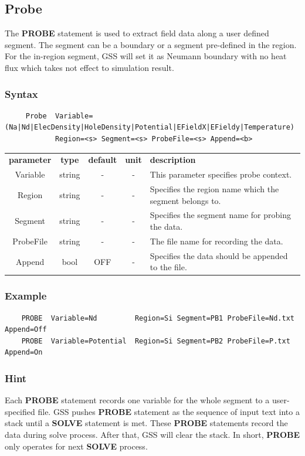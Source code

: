 \documentclass[11pt,pdftex]{article}
\begin{document}
\newpage
\subsection{Probe}
The \textbf{PROBE} statement is used to extract field data along a
user defined segment. The segment can be a boundary or a segment
pre-defined in the region. For the in-region segment, GSS will set
it as Neumann boundary with no heat flux which takes not effect to
simulation result.

\subsubsection*{Syntax}
\begin{verbatim}
     Probe  Variable=(Na|Nd|ElecDensity|HoleDensity|Potential|EFieldX|EFieldy|Temperature)
            Region=<s> Segment=<s> ProbeFile=<s> Append=<b>
\end{verbatim}

\small \noindent\begin{longtable}{ccccp{9cm}}
\textbf{parameter}   & \textbf{type}    & \textbf{default} & \textbf{unit} & \textbf{description} \\
Variable      & string  & -  & -             & This parameter specifies probe context.\\
Region        & string  & -  & -             & Specifies the region name which the segment belongs to.\\
Segment       & string  & -  & -             & Specifies the segment name for probing the data.\\
ProbeFile     & string  & -  & -             & The file name for recording the data.\\
Append        & bool    &OFF & -             & Specifies the data should be appended to the file.  \\
\end{longtable}
\normalsize

\subsubsection*{Example}
\begin{verbatim}
    PROBE  Variable=Nd         Region=Si Segment=PB1 ProbeFile=Nd.txt Append=Off
    PROBE  Variable=Potential  Region=Si Segment=PB2 ProbeFile=P.txt  Append=On
\end{verbatim}

\subsubsection*{Hint}
Each \textbf{PROBE} statement records one variable for the whole segment to a user-specified file.
GSS pushes \textbf{PROBE} statement as the sequence of input text into a stack until a
\textbf{SOLVE} statement is met. These \textbf{PROBE} statements record the data during solve process.
After that, GSS will clear the stack. In short, \textbf{PROBE} only operates for next \textbf{SOLVE} process.
\end{document}
